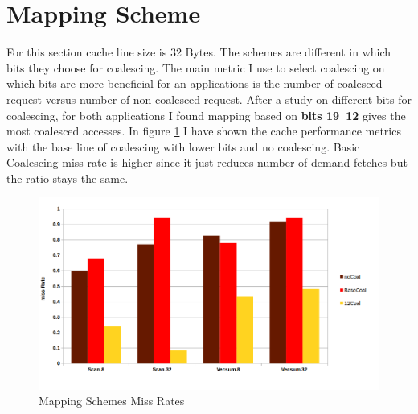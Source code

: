 \documentclass{article}
\begin{document}
\clearpage

\section{Mapping Scheme}
For this section cache line size is 32 Bytes. The schemes are different in which bits they choose for coalescing. The main metric I use to select coalescing on which bits are more beneficial for an applications is the number of coalesced request versus number of non coalesced request. After a study on different bits for coalescing, for both applications I found mapping based on \textbf{bits 19~12} gives the most coalesced accesses. In figure \ref{bitsgraph} I have shown the cache performance metrics with the base line of coalescing with lower bits and no coalescing. Basic Coalescing miss rate is higher since it just reduces number of demand fetches but the ratio stays the same.

\begin{figure}[h!]
  \centering
  \includegraphics[width=1.0\textwidth]{bitsgraph.png}
  \caption{Mapping Schemes Miss Rates}
  \label{bitsgraph}
\end{figure}

%
%
\end{document}
